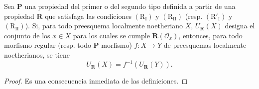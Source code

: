 \begin{proposition}[7.3.12]
\label{IV.2.s7.3.12-fr}
Sea $\boldsymbol P$ una propiedad del primer o del segundo tipo definida
a partir de una propiedad $\boldsymbol R$ que satisfaga las condiciones
$(\mathrm R_{\mathrm I})$ y $(\mathrm R_{\mathrm{II}})$ \textup{(resp.}
$(\mathrm R'_{\mathrm I})$ y $(\mathrm R_{\mathrm{II}})$). Si, para
todo preesquema localmente noetheriano $X$, $U_{\mathbf{R}}(X)$
designa el conjunto de los $x\in X$ para los cuales se cumple
$\boldsymbol R(\mathscr O_x)$, entonces, para todo morfismo regular
\textup{(resp.} todo $\boldsymbol P$-morfismo) $f:X\to Y$ de preesquemas
localmente noetherianos, se tiene
\begin{equation}
U_{\mathbf{R}}(X)=f^{-1}(U_{\mathbf{R}}(Y)).
\tag{7.3.12.1}
\label{IV.2.eq.7.3.12.1-fr}
\end{equation}
\end{proposition}

\begin{proof}
Es una consecuencia inmediata de las definiciones.
\end{proof}
